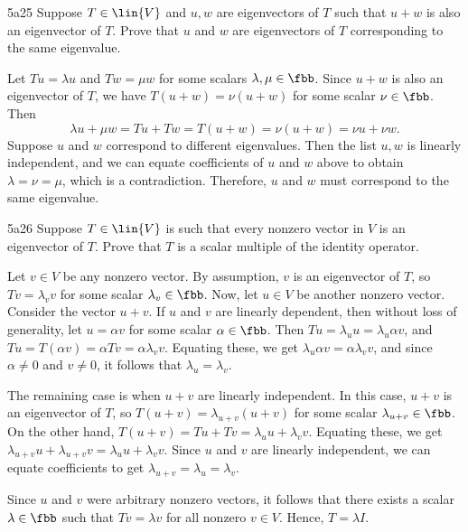 \begin{exercise}{5a25}
    Suppose $T \in \lin{V}$ and $u, w$ are eigenvectors of $T$ such that $u + w$ is also an eigenvector of $T$.
	Prove that $u$ and $w$ are eigenvectors of $T$ corresponding to the same eigenvalue.
\end{exercise}

\begin{sol}
    Let $Tu = \lambda u$ and $Tw = \mu w$ for some scalars $\lambda, \mu \in \fbb$.
	Since $u + w$ is also an eigenvector of $T$, we have $T(u + w) = \nu (u + w)$ for some scalar $\nu \in \fbb$.
	Then
    \[
    	\lambda u + \mu w = Tu + Tw = T(u + w) = \nu (u + w) = \nu u + \nu w.
    \]
    Suppose $u$ and $w$ correspond to different eigenvalues.
    Then the list $u, w$ is linearly independent, and we can equate coefficients of $u$ and $w$ above to obtain $\lambda = \nu = \mu$, which is a contradiction.
    Therefore, $u$ and $w$ must correspond to the same eigenvalue.
\end{sol}

\begin{exercise}{5a26}
    Suppose $T \in \lin{V}$ is such that every nonzero vector in $V$ is an eigenvector of $T$.
	Prove that $T$ is a scalar multiple of the identity operator.
\end{exercise}

\begin{sol}
    Let $v \in V$ be any nonzero vector.
	By assumption, $v$ is an eigenvector of $T$, so $Tv = \lambda_v v$ for some scalar $\lambda_v \in \fbb$.
	Now, let $u \in V$ be another nonzero vector.
	Consider the vector $u + v$.
	If $u$ and $v$ are linearly dependent, then without loss of generality, let $u = \alpha v$ for some scalar $\alpha \in \fbb$.
	Then $Tu = \lambda_u u = \lambda_u \alpha v$, and $Tu = T(\alpha v) = \alpha Tv = \alpha \lambda_v v$.
	Equating these, we get $\lambda_u \alpha v = \alpha \lambda_v v$, and since $\alpha \neq 0$ and $v \neq 0$, it follows that $\lambda_u = \lambda_v$.

    The remaining case is when $u + v$ are linearly independent.
	In this case, $u + v$ is an eigenvector of $T$, so $T(u + v) = \lambda_{u+v} (u + v)$ for some scalar $\lambda_{u+v} \in \fbb$.
	On the other hand, $T(u + v) = Tu + Tv = \lambda_u u + \lambda_v v$.
	Equating these, we get $\lambda_{u+v} u + \lambda_{u+v} v = \lambda_u u + \lambda_v v$.
	Since $u$ and $v$ are linearly independent, we can equate coefficients to get $\lambda_{u+v} = \lambda_u = \lambda_v$.
    
    Since $u$ and $v$ were arbitrary nonzero vectors, it follows that there exists a scalar $\lambda \in \fbb$ such that $Tv = \lambda v$ for all nonzero $v \in V$.
	Hence, $T = \lambda I$.
\end{sol}

